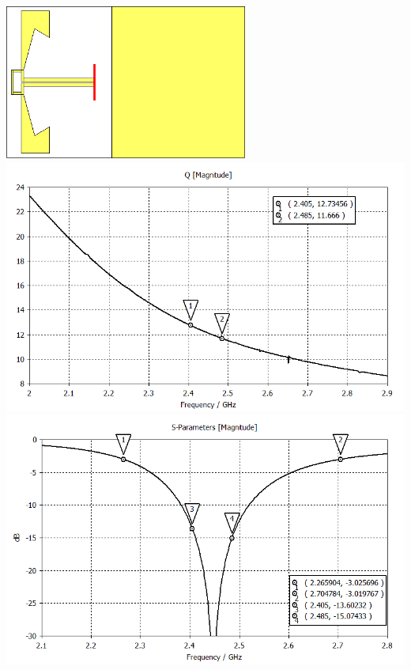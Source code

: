\documentclass[aspectratio=43]{beamer}
\begin{document}
\begin{frame}
\begin{columns}
				\includegraphics[width=0.6\textwidth]{lying_bifa_bb_3D.png}
				\includegraphics[width=\textwidth]{bifa_broadband_QZ.png}
				\includegraphics[width=\textwidth]{bifa_broadband_S11_dB.png}

\end{columns}
\end{frame}
\end{document}
